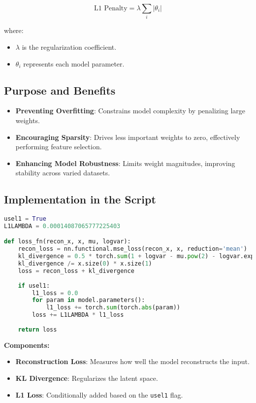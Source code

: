 \documentclass[10pt]{article}
\begin{document}
\[
\text{L1 Penalty} = \lambda \sum_{i} |\theta_i|
\]

where:
\begin{itemize}
    \item \( \lambda \) is the regularization coefficient.
    \item \( \theta_i \) represents each model parameter.
\end{itemize}

\subsection{Purpose and Benefits}
\begin{itemize}
    \item \textbf{Preventing Overfitting}: Constrains model complexity by penalizing large weights.
    \item \textbf{Encouraging Sparsity}: Drives less important weights to zero, effectively performing feature selection.
    \item \textbf{Enhancing Model Robustness}: Limits weight magnitudes, improving stability across varied datasets.
\end{itemize}

\subsection{Implementation in the Script}
\begin{lstlisting}[language=Python, caption=L1 Regularization Integration]
usel1 = True
L1LAMBDA = 0.00014087065777225403

def loss_fn(recon_x, x, mu, logvar):
    recon_loss = nn.functional.mse_loss(recon_x, x, reduction='mean')
    kl_divergence = 0.5 * torch.sum(1 + logvar - mu.pow(2) - logvar.exp())
    kl_divergence /= x.size(0) * x.size(1)
    loss = recon_loss + kl_divergence
    
    if usel1:
        l1_loss = 0.0
        for param in model.parameters():
            l1_loss += torch.sum(torch.abs(param))
        loss += L1LAMBDA * l1_loss
    
    return loss
\end{lstlisting}

\textbf{Components:}
\begin{itemize}
    \item \textbf{Reconstruction Loss}: Measures how well the model reconstructs the input.
    \item \textbf{KL Divergence}: Regularizes the latent space.
    \item \textbf{L1 Loss}: Conditionally added based on the \texttt{usel1} flag.
\end{itemize}
\end{document}
